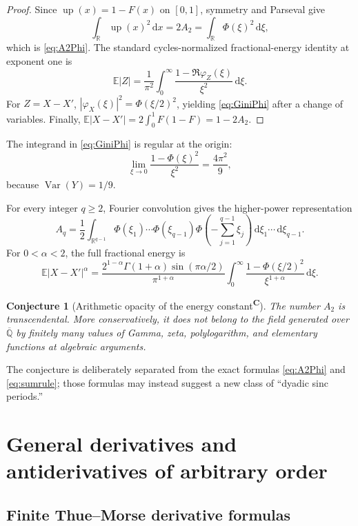 \documentclass[11pt,oneside]{article}
\newtheorem{conjecture}[theorem]{Conjecture}
\theoremstyle{definition}
\theoremstyle{remark}
\newcommand{\F}{F}
\newcommand{\Up}{\operatorname{up}}
\newcommand{\E}{\mathbb E}
\newcommand{\R}{\mathbb R}
\newcommand{\dd}{\,\mathrm d}
\newcommand{\tagconj}{\textsuperscript{\textcolor{oliveink}{\bfseries C}}}
\DeclareMathOperator{\Var}{Var}
\begin{document}
\begin{proof}
Since \(\Up(x)=1-\F(x)\) on \([0,1]\), symmetry and Parseval give
\[
 \int_{\R}\Up(x)^2\dd x=2A_2
 =\int_{\R}\Phi(\xi)^2\dd\xi,
\]
which is \eqref{eq:A2Phi}.  The standard cycles-normalized fractional-energy
identity at exponent one is
\[
 \E|Z|=\frac1{\pi^2}\int_0^\infty
 \frac{1-\Re\varphi_Z(\xi)}{\xi^2}\dd\xi.
\]
For \(Z=X-X'\),
\(|\varphi_X(\xi)|^2=\Phi(\xi/2)^2\), yielding \eqref{eq:GiniPhi} after a
change of variables.  Finally,
\(\E|X-X'|=2\int_0^1\F(1-\F)=1-2A_2\).
\end{proof}

The integrand in \eqref{eq:GiniPhi} is regular at the origin:
\begin{equation}
 \lim_{\xi\to0}\frac{1-\Phi(\xi)^2}{\xi^2}=\frac{4\pi^2}{9},
\end{equation}
because \(\Var(Y)=1/9\).

For every integer \(q\ge2\), Fourier convolution gives the higher-power
representation
\begin{equation}\label{eq:AqFourier}
 A_q=\frac12\int_{\R^{q-1}}
 \Phi(\xi_1)\cdots\Phi(\xi_{q-1})
 \Phi\!\left(-\sum_{j=1}^{q-1}\xi_j\right)
 \dd\xi_1\cdots\dd\xi_{q-1}.
\end{equation}
For \(0<\alpha<2\), the full fractional energy is
\begin{equation}\label{eq:fractionalenergy}
 \E|X-X'|^\alpha
 =\frac{2^{1-\alpha}\Gamma(1+\alpha)\sin(\pi\alpha/2)}
 {\pi^{1+\alpha}}
 \int_0^\infty\frac{1-\Phi(\xi/2)^2}{\xi^{1+\alpha}}\dd\xi.
\end{equation}

\begin{conjecture}[Arithmetic opacity of the energy constant\tagconj]
The number \(A_2\) is transcendental.  More conservatively, it does not belong
to the field generated over \(\overline{\mathbb Q}\) by finitely many values of
Gamma, zeta, polylogarithm, and elementary functions at algebraic arguments.
\end{conjecture}

The conjecture is deliberately separated from the exact formulas
\eqref{eq:A2Phi} and \eqref{eq:sumrule}; those formulas may instead suggest a
new class of ``dyadic sinc periods.''

\section{General derivatives and antiderivatives of arbitrary order}

\subsection{Finite Thue--Morse derivative formulas}
\end{document}
